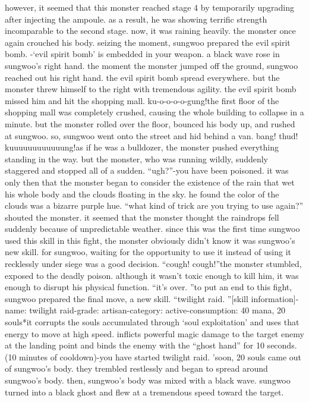 however, it seemed that this monster reached stage 4 by temporarily upgrading after injecting the ampoule.
 as a result, he was showing terrific strength incomparable to the second stage.
now, it was raining heavily.
 the monster once again crouched his body.
seizing the moment, sungwoo prepared the evil spirit bomb.
-‘evil spirit bomb’ is embedded in your weapon.
a black wave rose in sungwoo’s right hand.
 the moment the monster jumped off the ground, sungwoo reached out his right hand.
 the evil spirit bomb spread everywhere.
but the monster threw himself to the right with tremendous agility.
 the evil spirit bomb missed him and hit the shopping mall.
ku-o-o-o-o-gung!the first floor of the shopping mall was completely crushed, causing the whole building to collapse in a minute.
but the monster rolled over the floor, bounced his body up, and rushed at sungwoo.
so, sungwoo went onto the street and hid behind a van.
bang! thud! kuuuuuuuuuuuung!as if he was a bulldozer, the monster pushed everything standing in the way.
but the monster, who was running wildly, suddenly staggered and stopped all of a sudden.
“ugh?”-you have been poisoned.
it was only then that the monster began to consider the existence of the rain that wet his whole body and the clouds floating in the sky.
 he found the color of the clouds was a bizarre purple hue.
“what kind of trick are you trying to use again?” shouted the monster.
it seemed that the monster thought the raindrops fell suddenly because of unpredictable weather.
 since this was the first time sungwoo used this skill in this fight, the monster obviously didn’t know it was sungwoo’s new skill.
for sungwoo, waiting for the opportunity to use it instead of using it recklessly under siege was a good decision.
“cough! cough!”the monster stumbled, exposed to the deadly poison.
 although it wasn’t toxic enough to kill him, it was enough to disrupt his physical function.
“it’s over.
”to put an end to this fight, sungwoo prepared the final move, a new skill.
“twilight raid.
”[skill information]-name: twilight raid-grade: artisan-category: active-consumption: 40 mana, 20 souls*it corrupts the souls accumulated through ‘soul exploitation’ and uses that energy to move at high speed.
 inflicts powerful magic damage to the target enemy at the landing point and binds the enemy with the “ghost hand” for 10 seconds.
 (10 minutes of cooldown)-you have started twilight raid.
’soon, 20 souls came out of sungwoo’s body.
 they trembled restlessly and began to spread around sungwoo’s body.
 then, sungwoo’s body was mixed with a black wave.
sungwoo turned into a black ghost and flew at a tremendous speed toward the target.
